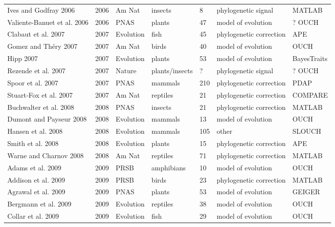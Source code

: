 \begin{landscape}
\begin{center}
\begin{longtable}{p{6cm}llllll}
Ives and Godfray 2006 &   2006    &   Am Nat  &   insects &   8   &   phylogenetic signal &   MATLAB  \\
Valiente-Banuet et al. 2006   &   2006    &   PNAS    &   plants  &   47  &   model of evolution  &   ? OUCH    \\
Clabaut et al. 2007   &   2007    &   Evolution   &   fish    &   45  &   phylogenetic correction &   APE \\
Gomez and Th\'{e}ry 2007  &   2007    &   Am Nat  &   birds   &   40  &   model of evolution  &   OUCH    \\
Hipp 2007 &   2007    &   Evolution   &   plants  &   53  &   model of evolution  &   BayesTraits \\
Rezende et al. 2007   &   2007    &   Nature  &   plants/insects  &   ?   &   phylogenetic signal &   ? OUCH    \\
Spoor et al. 2007 &   2007    &   PNAS    &   mammals &   210 &   phylogenetic correction &   PDAP    \\
Stuart‐Fox et al. 2007    &   2007    &   Am Nat  &   reptiles    &   21  &   phylogenetic correction &   COMPARE \\
Buchwalter et al. 2008    &   2008    &   PNAS    &   insects &   21  &   phylogenetic correction &   MATLAB  \\
Dumont and Payseur 2008   &   2008    &   Evolution   &   mammals &   13  &   model of evolution  &   OUCH    \\
Hansen et al. 2008    &   2008    &   Evolution   &   mammals &   105 &   other   &   SLOUCH  \\
Smith et al. 2008 &   2008    &   Evolution   &   plants  &   15  &   phylogenetic correction &   APE \\
Warne and Charnov 2008    &   2008    &   Am Nat  &   reptiles    &   71  &   phylogenetic correction &   MATLAB  \\
Adams et al. 2009 &   2009    &   PRSB    &   amphibians  &   10  &   model of evolution  &   OUCH    \\
Addison et al. 2009   &   2009    &   PRSB    &   birds   &   23  &   phylogenetic correction &   MATLAB  \\
Agrawal et al. 2009   &   2009    &   PNAS    &   plants  &   53  &   model of evolution  &   GEIGER  \\
Bergmann et al. 2009  &   2009    &   Evolution   &   reptiles    &   38  &   model of evolution  &   OUCH    \\
Collar et al. 2009    &   2009    &   Evolution   &   fish    &   29  &   model of evolution  &   OUCH    \\

\end{longtable}
\end{center}
\end{landscape}
